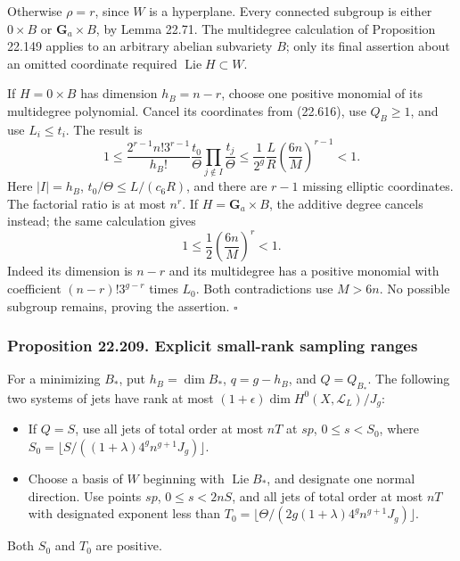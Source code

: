 \documentclass[
  11pt,
  a4paper,
]{article}
\providecommand{\tightlist}{%
  \setlength{\itemsep}{0pt}\setlength{\parskip}{0pt}}
\begin{document}
Otherwise \(\rho=r\), since \(W\) is a hyperplane. Every connected
subgroup is either \(0\times B\) or \(\mathbf G_a\times B\), by Lemma
22.71. The multidegree calculation of Proposition 22.149 applies to an
arbitrary abelian subvariety \(B\); only its final assertion about an
omitted coordinate required \(\operatorname{Lie}H\subset W\).

If \(H=0\times B\) has dimension \(h_B=n-r\), choose one positive
monomial of its multidegree polynomial. Cancel its coordinates from
(22.616), use \(Q_B\ge1\), and use \(L_i\le t_i\). The result is \[
 1\le\frac{2^{r-1}n!3^{r-1}}{h_B!}
       \frac{t_0}{\Theta}
       \prod_{j\notin I}\frac{t_j}{\Theta}
 \le\frac1{2^g}\frac LR
               \left(\frac{6n}{M}\right)^{r-1}<1.
 \tag{22.618}
\] Here \(|I|=h_B\), \(t_0/\Theta\le L/(c_6R)\), and there are \(r-1\)
missing elliptic coordinates. The factorial ratio is at most \(n^r\). If
\(H=\mathbf G_a\times B\), the additive degree cancels instead; the same
calculation gives \[
 1\le\frac12\left(\frac{6n}{M}\right)^r<1.
 \tag{22.619}
\] Indeed its dimension is \(n-r\) and its multidegree has a positive
monomial with coefficient \((n-r)!3^{g-r}\) times \(L_0\). Both
contradictions use \(M>6n\). No possible subgroup remains, proving the
assertion. \(\square\)

\subsubsection{Proposition 22.209. Explicit small-rank sampling
ranges}\label{proposition-22.209.-explicit-small-rank-sampling-ranges}

For a minimizing \(B_*\), put \(h_B=\dim B_*\), \(q=g-h_B\), and
\(Q=Q_{B_*}\). The following two systems of jets have rank at most
\((1+\epsilon)\dim H^0(X,\mathcal L_L)/J_g\):

\begin{itemize}
\tightlist
\item
  If \(Q=S\), use all jets of total order at most \(nT\) at \(sp\),
  \(0\le s<S_0\), where
  \(S_0=\lfloor S/((1+\lambda)4^gn^{g+1}J_g)\rfloor\).
\item
  Choose a basis of \(W\) beginning with \(\operatorname{Lie}B_*\), and
  designate one normal direction. Use points \(sp\), \(0\le s<2nS\), and
  all jets of total order at most \(nT\) with designated exponent less
  than \(T_0=\lfloor\Theta/(2g(1+\lambda)4^gn^{g+1}J_g)\rfloor\).
\end{itemize}

Both \(S_0\) and \(T_0\) are positive.
\end{document}

